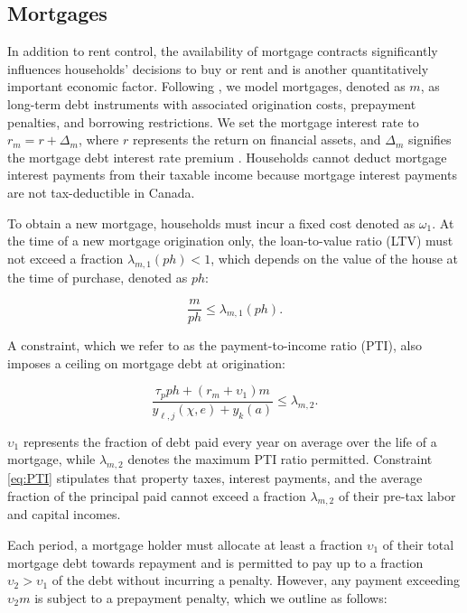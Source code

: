 \documentclass[parskip=full]{article}
\begin{document}
\subsection{Mortgages}\label{subsection:morgtages}

In addition to rent control, the availability of mortgage contracts significantly influences households' decisions to buy or rent and is another quantitatively important economic factor. Following \citet{kkk-2021}, we model mortgages, denoted as $m$, as long-term debt instruments with associated origination costs, prepayment penalties, and borrowing restrictions. We set the mortgage interest rate to $r_{m}=r+\Delta_m$, where $r$ represents the return on financial assets, and $\Delta_m$ signifies the mortgage debt interest rate premium \citep{sommeretal-2013,sommersullivan-2017,kaplanetal-2019}. Households cannot deduct mortgage interest payments from their taxable income because mortgage interest payments are not tax-deductible in Canada.

To obtain a new mortgage, households must incur a fixed cost denoted as $\omega_{1}$. At the time of a new mortgage origination only, the loan-to-value ratio (LTV) must not exceed a fraction $\lambda_{m,1}(ph)<1$, which depends on the value of the house at the time of purchase, denoted as $ph$:

\begin{equation}\label{eq:LTV}
\frac{m}{p h} \leq \lambda_{m,1}(ph).
\end{equation}

\noindent A constraint, which we refer to as the payment-to-income ratio (PTI), also imposes a ceiling on mortgage debt at origination:

\begin{equation}\label{eq:PTI}
\frac{\tau_{p}ph+(r_{m}+\upsilon_{1})m}{y_{\ell,j}(\chi,e)+y_{k}(a)} \leq \lambda_{m,2}.
\end{equation}

\noindent $\upsilon_{1}$ represents the fraction of debt paid every year on average over the life of a mortgage, while $\lambda_{m,2}$ denotes the maximum PTI ratio permitted. Constraint \eqref{eq:PTI} stipulates that property taxes, interest payments, and the average fraction of the principal paid cannot exceed a fraction $\lambda_{m,2}$ of their pre-tax labor and capital incomes.

Each period, a mortgage holder must allocate at least a fraction $\upsilon_{1}$ of their total mortgage debt towards repayment and is permitted to pay up to a fraction $\upsilon_{2}>\upsilon_{1}$ of the debt without incurring a penalty. However, any payment exceeding $\upsilon_{2}m$ is subject to a prepayment penalty, which we outline as follows:
\end{document}

